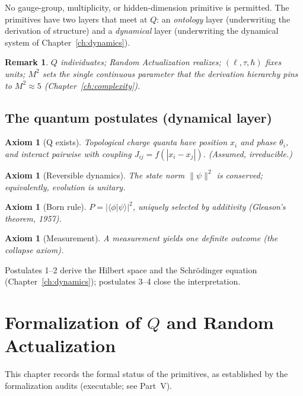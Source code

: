 \documentclass[11pt,twoside]{book}
\newtheorem{axiom}[theorem]{Axiom}
\newtheorem{remark}[theorem]{Remark}
\begin{document}
No gauge-group, multiplicity, or hidden-dimension primitive is permitted. The primitives
have two layers that meet at $Q$: an \emph{ontology} layer (underwriting the derivation of
structure) and a \emph{dynamical} layer (underwriting the dynamical system of
Chapter~\ref{ch:dynamics}).

\begin{remark}
$Q$ individuates; Random Actualization realizes; $(\ell,\tau,\hbar)$ fixes units; $M^2$
sets the single continuous parameter that the derivation hierarchy pins to $M^2\approx5$
(Chapter~\ref{ch:complexity}).
\end{remark}

\section{The quantum postulates (dynamical layer)}

\begin{axiom}[Q exists]
Topological charge quanta have position $x_i$ and phase $\theta_i$, and interact pairwise
with coupling $J_{ij}=f(|x_i-x_j|)$. (Assumed, irreducible.)
\end{axiom}

\begin{axiom}[Reversible dynamics]
The state norm $\|\psi\|^2$ is conserved; equivalently, evolution is unitary.
\end{axiom}

\begin{axiom}[Born rule]
$P=|\langle\phi|\psi\rangle|^2$, uniquely selected by additivity (Gleason's theorem, 1957).
\end{axiom}

\begin{axiom}[Measurement]
A measurement yields one definite outcome (the collapse axiom).
\end{axiom}

Postulates 1--2 derive the Hilbert space and the Schr\"odinger equation
(Chapter~\ref{ch:dynamics}); postulates 3--4 close the interpretation.


\chapter{Formalization of $Q$ and Random Actualization}
\label{ch:formalization}

This chapter records the formal status of the primitives, as established by the
formalization audits (executable; see Part~V).
\end{document}

